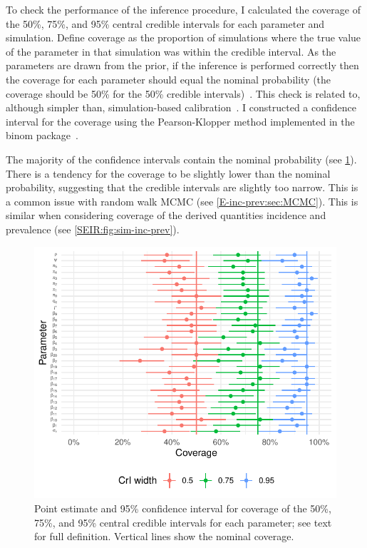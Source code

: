 \documentclass[thesis.tex]{subfiles}
\begin{document}
To check the performance of the inference procedure, I calculated the coverage of the 50\%, 75\%, and 95\% central credible intervals for each parameter and simulation.
Define coverage as the proportion of simulations where the true value of the parameter in that simulation was within the credible interval.
As the parameters are drawn from the prior, if the inference is performed correctly then the coverage for each parameter should equal the nominal probability (\eg the coverage should be 50\% for the 50\% credible intervals)~\autocite{cookValidation}.
This check is related to, although simpler than, simulation-based calibration~\autocite{taltsValidating}.
I constructed a confidence interval for the coverage using the Pearson-Klopper method implemented in the binom package~\autocite{binom1-1}.

The majority of the confidence intervals contain the nominal probability (see \cref{SEIR:fig:sim-coverage}).
There is a tendency for the coverage to be slightly lower than the nominal probability, suggesting that the credible intervals are slightly too narrow.
This is a common issue with random walk MCMC (see \cref{E-inc-prev:sec:MCMC}).
This is similar when considering coverage of the derived quantities incidence and prevalence (see \cref{SEIR:fig:sim-inc-prev}).
\begin{figure}
    \includegraphics{SEIR/sim/coverage}
    \caption[Coverage of simulation study]{%
        Point estimate and 95\% confidence interval for coverage of the 50\%, 75\%, and 95\% central credible intervals for each parameter; see text for full definition.
        Vertical lines show the nominal coverage.
    }
    \label{SEIR:fig:sim-coverage}
\end{figure}
\end{document}

